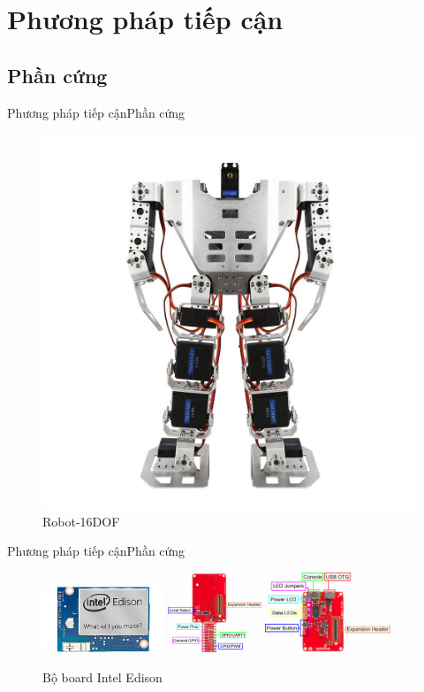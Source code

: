 \documentclass[compress, blue, 14pt,hyperref={pdfpagemode=FullScreen}]{beamer}
\begin{document}
\section{Phương pháp tiếp cận}
\subsection{Phần cứng}
\begin{frame}{Phương pháp tiếp cận}{Phần cứng}
\begin{figure}[hbtp]
\centering
\includegraphics[scale=0.15]{images/01_150_2_1024x1024.jpg}
\caption{Robot-16DOF}
\end{figure}
\end{frame}
\begin{frame}{Phương pháp tiếp cận}{Phần cứng}
\begin{figure}[hbtp]
\centering
\includegraphics[height = 2cm]{images/MakerBoards-Edison.jpg}
\includegraphics[height = 2.4cm]{images/GPIOBlockAnnotated.png}
\includegraphics[height = 2.4cm]{images/BaseAnnotated.png}
\caption{Bộ board Intel Edison}
\end{figure}
\end{frame}
\end{document}
